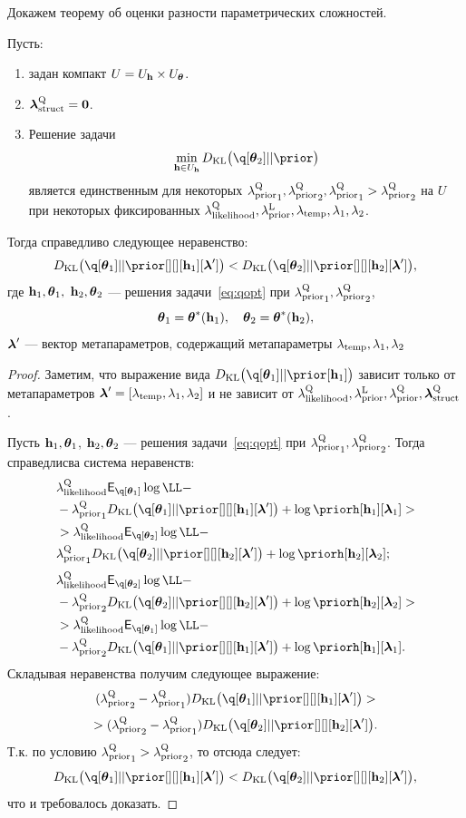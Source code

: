 Докажем теорему об оценки разности параметрических сложностей.
\begin{lemma}
\label{lem:cp}
Пусть:
\begin{enumerate}
\item задан компакт $U = U_{\mathbf{h}} \times U_{\boldsymbol{\theta}}$. 
\item $\boldsymbol{\lambda}_\text{struct}^\text{Q}=\mathbf{0}$.
\item Решение задачи
\begin{equation}
\label{eq:cp_theorem_kl}
\min_{\h \in \Uh} \KL{\q[\teta_2]}{\prior}
\end{equation}
 является единственным для некоторых ${\lambda_\text{prior}^\text{Q}}_1, {\lambda_\text{prior}^\text{Q}}_2, {\lambda_\text{prior}^\text{Q}}_1 > {\lambda_\text{prior}^\text{Q}}_2$ на $U$ при некоторых фиксированных $\lambda_\text{likelihood}^\text{Q}, \lambda_\text{prior}^\text{L}, \lambda_{\text{temp}}, \lambda_1, \lambda_2$.
\end{enumerate}

Тогда справедливо следующее неравенство:
\[
    \KL{\q[\teta_1]}{\prior[][][\h_1][\lam']}  <   \KL{\q[\teta_2]}{\prior[][][\h_2][\lam']},
\]
где $\mathbf{h}_1, \boldsymbol{\theta}_1,$ $\mathbf{h}_2, \boldsymbol{\theta}_2$  --- решения задачи~\eqref{eq:qopt} при ${\lambda_\text{prior}^\text{Q}}_1, {\lambda_\text{prior}^\text{Q}}_2$,
$$
\boldsymbol{\theta}_1 = \boldsymbol{\theta}^{*}(\mathbf{h}_1), \quad  \boldsymbol{\theta}_2 = \boldsymbol{\theta}^{*}(\mathbf{h}_2),
$$
$\boldsymbol{\lambda}'$ --- вектор метапараметров, содержащий метапараметры $\lambda_{\text{temp}}, \lambda_1, \lambda_2$

\end{lemma}
\begin{proof}
Заметим, что выражение вида $\KL{\q[\teta_1]}{\prior[\h_1]}$ зависит только от метапараметров  $\boldsymbol{\lambda}' = [\lambda_{\text{temp}}, \lambda_1, \lambda_2]$ и не зависит от $\lambda_\text{likelihood}^\text{Q}, \lambda_\text{prior}^\text{L}, \lambda_\text{prior}^\text{Q}, \boldsymbol{\lambda}_\text{struct}^\text{Q}$.  

Пусть $\mathbf{h}_1, \boldsymbol{\theta}_1$, $\mathbf{h}_2, \boldsymbol{\theta}_2$  --- решения задачи~\eqref{eq:qopt} при ${\lambda_\text{prior}^\text{Q}}_1, {\lambda_\text{prior}^\text{Q}}_2$.
Тогда справедлисва система неравенств:
\begin{align*}
&\lamLL \E_{\q[\teta_1]}\log \LL - \\
&-{\lamCQ}_1\KL{\q[\teta_1]}{\prior[][][\h_1][\lam']} + \log\priorh[\h_1][\lam_1]> \\
&> \lamLL \E_{\q[\teta_2]}\log \LL - \\
&{\lamCQ}_1\KL{\q[\teta_2]}{\prior[][][\h_2][\lam']} + \log\priorh[\h_2][\lam_2];
\end{align*}
\begin{align*}
&\lamLL \E_{\q[\teta_2]}\log \LL - \\
&-{\lamCQ}_2\KL{\q[\teta_2]}{\prior[][][\h_2][\lam']} + \log\priorh[\h_2][\lam_2] >\\
&> \lamLL \E_{\q[\teta_1]}\log \LL -\\
&- {\lamCQ}_2\KL{\q[\teta_1]}{\prior[][][\h_1][\lam']} + \log\priorh[\h_1][\lam_1].
\end{align*}
Складывая неравенства получим следующее выражение:
\[
   ({\lamCQ}_2 - {\lamCQ}_1 )\KL{\q[\teta_1]}{\prior[][][\h_1][\lam']}  >
\]
\[
>    ({\lamCQ}_2 - {\lamCQ}_1 )\KL{\q[\teta_2]}{\prior[][][\h_2][\lam']}. 
\]
Т.к. по условию ${\lambda_\text{prior}^\text{Q}}_1 > {\lambda_\text{prior}^\text{Q}}_2$, то отсюда следует:
\[
    \KL{\q[\teta_1]}{\prior[][][\h_1][\lam']}  <   \KL{\q[\teta_2]}{\prior[][][\h_2][\lam']},
\]
что и требовалось доказать.
\end{proof}

